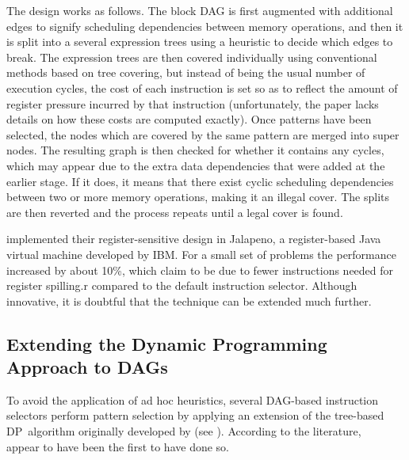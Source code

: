The design works as follows.
%
The \gls{block DAG} is first augmented with additional \glspl{edge} to signify
scheduling dependencies between memory operations, and then it is split into a
several \glspl{expression tree} using a heuristic to decide which \glspl{edge}
to break.
%
The \glspl{expression tree} are then covered individually using conventional
methods based on \gls{tree covering}, but instead of being the usual number of
execution cycles, the cost of each \gls{instruction} is set so as to reflect the
amount of \gls{register pressure} incurred by that instruction (unfortunately,
the paper lacks details on how these costs are computed exactly).
%
Once \glspl{pattern} have been selected, the \glspl{node} which are covered by
the same \gls{pattern} are merged into \glspl{super node}.
%
The resulting \gls{graph} is then checked for whether it contains any
\glspl{cycle}, which may appear due to the extra data dependencies that were
added at the earlier stage.
%
If it does, it means that there exist cyclic scheduling dependencies between two
or more memory operations, making it an illegal cover.
%
The splits are then reverted and the process repeats until a legal cover is
found.

\citeauthor{Sarkar2001} implemented their \gls{register}-sensitive design in
\gls{Jalapeno}, a \gls{register}-based \gls{Java} virtual machine developed by
\gls{IBM}.
%
For a small set of problems the performance increased by about 10\%, which
\citeauthor{Sarkar2001} claim to be due to fewer \glspl{instruction} needed for
\gls{register} \gls{spilling.r} compared to the default \gls{instruction
  selector}.
%
Although innovative, it is doubtful that the technique can be extended much
further.


\subsection{Extending the Dynamic Programming Approach to DAGs}

To avoid the application of ad hoc heuristics, several \gls{DAG}-based
\glspl{instruction selector} perform \gls{pattern selection} by applying an
extension of the \gls{tree}-based \gls{DP}~algorithm originally developed by
\textcite{Aho1976a} (see ).
%
According to the literature, \citeauthor{Liem1994}~\cite{Liem1994, Paulin1994,
  Paulin1995} appear to have been the first to have done so.

